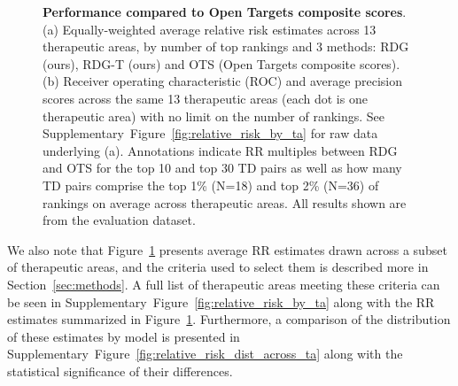 \documentclass{article}
\begin{document}
\begin{figure}[!htb]
  \centering
  \captionsetup{width=.9\linewidth}
  \captionsetup[subfigure]{labelformat=empty}
  \qquad
  \caption{
    \textbf{Performance compared to Open Targets composite scores}.
    (a) Equally-weighted average relative risk estimates across 13 therapeutic areas, by number of top rankings and 3 methods: RDG (ours), RDG-T (ours) and OTS (Open Targets composite scores). 
    (b) Receiver operating characteristic (ROC) and average precision scores across the same 13 therapeutic areas (each dot is one therapeutic area) with no limit on the number of rankings.
    See Supplementary~Figure~\ref{fig:relative_risk_by_ta} for raw data underlying (a).
    Annotations indicate RR multiples between RDG and OTS for the top 10 and top 30 TD pairs as well as how many TD pairs comprise the top 1\% (N=18) and top 2\% (N=36) of rankings on average across therapeutic areas. All results shown are from the evaluation dataset.
  }
  \label{fig:performance_across_ta}
\end{figure}

We also note that Figure~\ref{fig:performance_across_ta} presents average RR estimates drawn across a subset of therapeutic areas, and the criteria used to select them is described more in Section~\ref{sec:methods}. A full list of therapeutic areas meeting these criteria can be seen in Supplementary~Figure~\ref{fig:relative_risk_by_ta} along with the RR estimates summarized in Figure~\ref{fig:performance_across_ta}. Furthermore, a comparison of the distribution of these estimates by model is presented in Supplementary~Figure~\ref{fig:relative_risk_dist_across_ta} along with the statistical significance of their differences.
\end{document}
